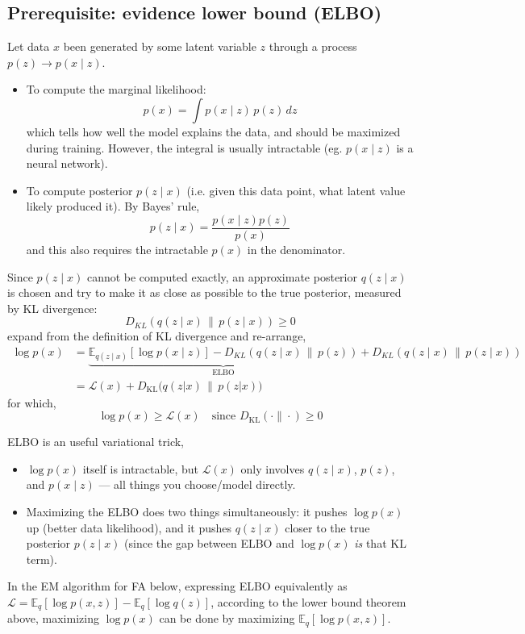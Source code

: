 \documentclass[11pt]{article}
\begin{document}
\subsection{Prerequisite: evidence lower bound (ELBO)}
Let data $x$ been generated by some latent variable $z$ through a process $p(z) \to p(x \mid z)$. 
\begin{itemize}
    \item To compute the marginal likelihood:
    \[
    p(x) = \int p(x \mid z)\, p(z) \, dz
    \]
    which tells how well the model explains the data, and should be maximized during training. However, the integral is usually intractable (eg. $p(x \mid z)$ is a neural network).
    \item To compute posterior $p(z \mid x)$ (i.e. given this data point, what latent value likely produced it). By Bayes' rule,
    \[
    p(z \mid x) = \frac{p(x \mid z)p(z)}{p(x)}
    \]
    and this also requires the intractable $p(x)$ in the denominator.

\end{itemize}

Since $p(z \mid x)$ cannot be computed exactly, an approximate posterior $q(z \mid x)$ is chosen and try to make it as close as possible to the true posterior, measured by KL divergence:
\[
D_{KL}(q(z \mid x) \, \| \, p(z \mid x)) \geq 0
\]
expand from the definition of KL divergence and re-arrange,
\[
\begin{aligned}
\log p(x) &= \underbrace{\mathbb{E}_{q(z\mid x)}[\log p(x \mid z)] - D_{KL}(q(z \mid x) \, \| \, p(z))}_{\text{ELBO}} + D_{KL}(q(z \mid x) \, \| \, p(z \mid x)) \\
&= \mathcal{L}(x) + D_{\mathrm{KL}}\big(q(z|x)\,\|\,p(z|x)\big)
\end{aligned}
\]
for which,
\[
\log p(x) \geq \mathcal{L}(x) \quad \text{since } D_{\mathrm{KL}}(\cdot\|\cdot) \geq 0
\]

ELBO is an useful variational trick,
\begin{itemize}
    \item $\log p(x)$ itself is intractable, but $\mathcal{L}(x)$ only involves $q(z \mid x)$, $p(z)$, and $p(x \mid z)$ --- all things you choose/model directly.
    \item Maximizing the ELBO does two things simultaneously: it pushes $\log p(x)$ up (better data likelihood), and it pushes $q(z \mid x)$ closer to the true posterior $p(z \mid x)$ (since the gap between ELBO and $\log p(x)$ \textit{is} that KL term).
\end{itemize}
In the EM algorithm for FA below, expressing ELBO equivalently as $\mathcal{L} = \mathbb{E}_q\left[\log p(x , z)\right] - \mathbb{E}_q[\log q(z)]$, according to the lower bound theorem above, maximizing $\log p(x)$ can be done by maximizing $\mathbb{E}_q\left[\log p(x , z)\right]$.
\end{document}
